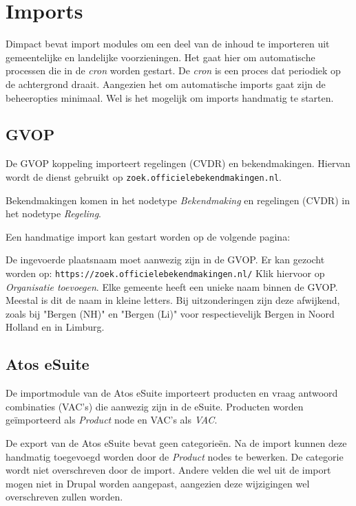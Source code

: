 \section{Imports}

Dimpact bevat import modules om een deel van de inhoud te importeren uit gemeentelijke en landelijke voorzieningen. Het gaat hier om automatische processen die in de \emph{cron} worden gestart. De \emph{cron} is een proces dat periodiek op de achtergrond draait. Aangezien het om automatische imports gaat zijn de beheeropties minimaal. Wel is het mogelijk om imports handmatig te starten.

\subsection{GVOP}

De GVOP koppeling importeert regelingen (CVDR) en bekendmakingen. Hiervan wordt de dienst gebruikt op \texttt{zoek.officielebekendmakingen.nl}.

Bekendmakingen komen in het nodetype \emph{Bekendmaking} en regelingen (CVDR) in het nodetype \emph{Regeling}.

Een handmatige import kan gestart worden op de volgende pagina: \\

De ingevoerde plaatsnaam moet aanwezig zijn in de GVOP. Er kan gezocht worden op:
\texttt{https://zoek.officielebekendmakingen.nl/}
Klik hiervoor op \emph{Organisatie toevoegen}.
Elke gemeente heeft een unieke naam binnen de GVOP. Meestal is dit de naam in kleine letters. Bij uitzonderingen zijn deze afwijkend, zoals bij "Bergen (NH)" en "Bergen (Li)" voor respectievelijk Bergen in Noord Holland en in Limburg.

\subsection{Atos eSuite}

De importmodule van de Atos eSuite importeert producten en vraag antwoord combinaties (VAC's) die aanwezig zijn in de eSuite. Producten worden ge\"{i}mporteerd als \emph{Product} node en VAC's als \emph{VAC}.

De export van de Atos eSuite bevat geen categorie\"{e}n. Na de import kunnen deze handmatig toegevoegd worden door de \emph{Product} nodes te bewerken. De categorie wordt niet overschreven door de import. Andere velden die wel uit de import mogen niet in Drupal worden aangepast, aangezien deze wijzigingen wel overschreven zullen worden.

